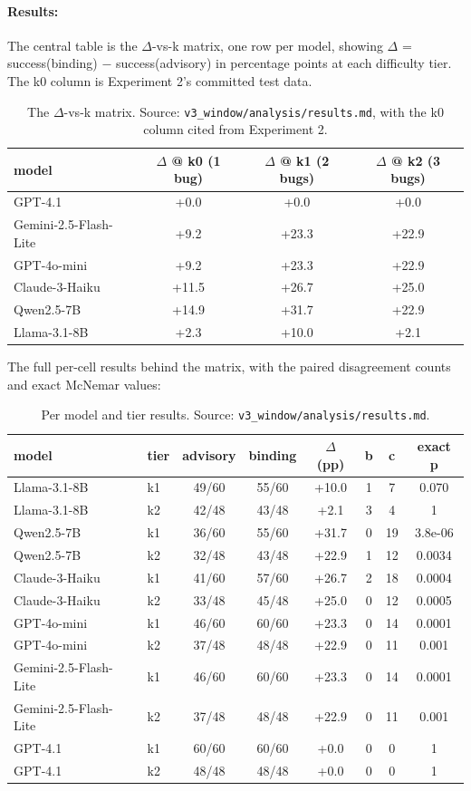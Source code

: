 \paragraph{Results:} The central table is the $\Delta$-vs-k matrix, one row per model, showing $\Delta$ = success(binding) $-$ success(advisory) in percentage points at each difficulty tier. The k0 column is Experiment 2's committed test data.

\begin{table}[h]
\centering
\begin{tabular}{lccc}
\toprule
model & $\Delta$ @ k0 (1 bug) & $\Delta$ @ k1 (2 bugs) & $\Delta$ @ k2 (3 bugs)\\
\midrule
GPT-4.1 & +0.0 & +0.0 & +0.0\\
Gemini-2.5-Flash-Lite & +9.2 & +23.3 & +22.9\\
GPT-4o-mini & +9.2 & +23.3 & +22.9\\
Claude-3-Haiku & +11.5 & +26.7 & +25.0\\
Qwen2.5-7B & +14.9 & +31.7 & +22.9\\
Llama-3.1-8B & +2.3 & +10.0 & +2.1\\
\bottomrule
\end{tabular}
\caption{The $\Delta$-vs-k matrix. Source: \texttt{v3\_window/analysis/results.md}, with the k0 column cited from Experiment 2.}
\label{tab:matrix}
\end{table}

The full per-cell results behind the matrix, with the paired disagreement counts and exact McNemar values:

\begin{table}[h]
\centering
\begin{tabular}{llcccccc}
\toprule
model & tier & advisory & binding & $\Delta$ (pp) & b & c & exact p\\
\midrule
Llama-3.1-8B & k1 & 49/60 & 55/60 & +10.0 & 1 & 7 & 0.070\\
Llama-3.1-8B & k2 & 42/48 & 43/48 & +2.1 & 3 & 4 & 1\\
Qwen2.5-7B & k1 & 36/60 & 55/60 & +31.7 & 0 & 19 & 3.8e-06\\
Qwen2.5-7B & k2 & 32/48 & 43/48 & +22.9 & 1 & 12 & 0.0034\\
Claude-3-Haiku & k1 & 41/60 & 57/60 & +26.7 & 2 & 18 & 0.0004\\
Claude-3-Haiku & k2 & 33/48 & 45/48 & +25.0 & 0 & 12 & 0.0005\\
GPT-4o-mini & k1 & 46/60 & 60/60 & +23.3 & 0 & 14 & 0.0001\\
GPT-4o-mini & k2 & 37/48 & 48/48 & +22.9 & 0 & 11 & 0.001\\
Gemini-2.5-Flash-Lite & k1 & 46/60 & 60/60 & +23.3 & 0 & 14 & 0.0001\\
Gemini-2.5-Flash-Lite & k2 & 37/48 & 48/48 & +22.9 & 0 & 11 & 0.001\\
GPT-4.1 & k1 & 60/60 & 60/60 & +0.0 & 0 & 0 & 1\\
GPT-4.1 & k2 & 48/48 & 48/48 & +0.0 & 0 & 0 & 1\\
\bottomrule
\end{tabular}
\caption{Per model and tier results. Source: \texttt{v3\_window/analysis/results.md}.}
\label{tab:cells}
\end{table}

